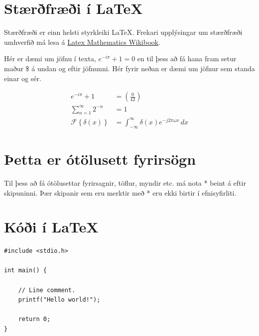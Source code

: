 \documentclass[a4paper]{article}
\begin{document}
\section{Stærðfræði í \LaTeX}
Stærðfræði er einn helsti styrkleiki \LaTeX. Frekari upplýsingar um stærðfræði umhverfið má lesa á \href{http://en.wikibooks.org/wiki/LaTeX/Mathematics}{Latex Mathematics Wikibook}.

Hér er dæmi um jöfnu í texta, $e^{-i\pi} + 1 = 0$ en til þess að fá hana fram setur maður \$ á undan og eftir jöfnunni. Hér fyrir neðan er dæmi um jöfnur sem standa einar og sér.


\begin{align}
	e^{-i\pi} + 1 &= \left(\frac{0}{42}\right) \\ %
    \sum_{n=1}^{\infty} 2^{-n} &= 1 \\
    \mathcal{F}\left\{ \delta(x) \right\} &= \int_{-\infty}^{\infty} \delta(x) e^{-j 2 \pi \omega x}\,dx\nonumber %
\end{align}

\pagebreak %

\section*{Þetta er ótölusett fyrirsögn}
Til þess að fá ótölusettar fyrirsagnir, töflur, myndir etc. má nota * beint á eftir skipuninni. Þær skipanir sem eru merktir með * eru ekki birtir í efnisyfirliti.


\section{Kóði í \LaTeX}

\begin{lstlisting}
#include <stdio.h>
 
int main() {
 
    // Line comment.
    printf("Hello world!");
 
    return 0;
}
\end{lstlisting}
\end{document}
